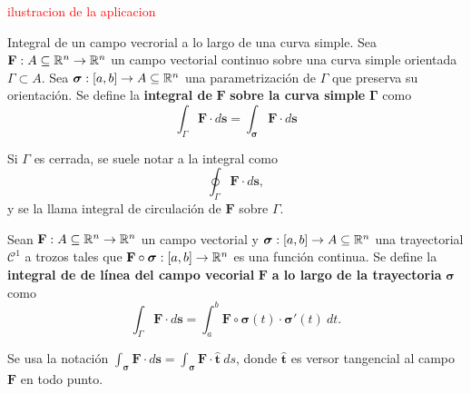 \textcolor{red}{ilustracion de la aplicacion}

\begin{definition}
    Integral de un campo vecrorial a lo largo de una curva simple.
    Sea $\mathbf{F}:A\subseteq\mathbb{R}^n\to\mathbb{R}^n$ un campo vectorial continuo sobre una curva simple orientada $\Gamma\subset A$. Sea $\boldsymbol{\sigma}:[a,b]\to A\subseteq\mathbb{R}^n$ una parametrizaci\'on de $\Gamma$ que preserva su orientaci\'on. Se define la \textbf{integral de} $\mathbf{F}$ \textbf{sobre la curva simple} $\boldsymbol{\Gamma}$ como
    \[
        \int_{\Gamma}\mathbf{F}\cdot d\mathbf{s}=\int_{\boldsymbol{\sigma}}\mathbf{F}\cdot d\mathbf{s} 
    \]
\end{definition}

Si $\Gamma$ es cerrada, se suele notar a la integral como
\[
    \oint_{\Gamma}\mathbf{F}\cdot d\mathbf{s},  
\]
y se la llama integral de circulaci\'on de $\mathbf{F}$ sobre $\Gamma$.

\begin{definition}
    Sean $\mathbf{F}:A\subseteq\mathbb{R}^n\to\mathbb{R}^n$ un campo vectorial y $\boldsymbol{\sigma}:[a,b]\to A\subseteq\mathbb{R}^n$ una trayectorial $\mathcal{C}^1$ a trozos tales que $\mathbf{F}\circ\boldsymbol{\sigma}:[a,b]\to\mathbb{R}^n$ es una funci\'on continua. Se define la \textbf{integral de de l\'inea del campo vecorial} $\mathbf{F}$ \textbf{a lo largo de la trayectoria} $\boldsymbol{\sigma}$ como
    \[
        \int_{\Gamma}\mathbf{F}\cdot d\mathbf{s}=\int_a^b\mathbf{F}\circ\boldsymbol{\sigma}(t)\cdot\boldsymbol{\sigma}'(t)\:dt. 
    \]
\end{definition}

Se usa la notaci\'on $\int_{\boldsymbol{\sigma}}\mathbf{F}\cdot d\mathbf{s}=\int_{\boldsymbol{\sigma}}\mathbf{F}\cdot\hat{\mathbf{t}}\:ds$, donde $\hat{\mathbf{t}}$ es versor tangencial al campo $\mathbf{F}$ en todo punto.
